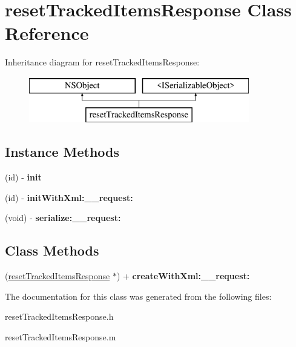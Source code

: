 \hypertarget{interfacereset_tracked_items_response}{}\section{reset\+Tracked\+Items\+Response Class Reference}
\label{interfacereset_tracked_items_response}
Inheritance diagram for reset\+Tracked\+Items\+Response\+:\begin{figure}[H]
\begin{center}
\leavevmode
\includegraphics[height=2.000000cm]{interfacereset_tracked_items_response}
\end{center}
\end{figure}
\subsection*{Instance Methods}
\begin{DoxyCompactItemize}
\item 
\hypertarget{interfacereset_tracked_items_response_a8fa82d26c8ab63be27c94736599c8b39}{}(id) -\/ {\bfseries init}\label{interfacereset_tracked_items_response_a8fa82d26c8ab63be27c94736599c8b39}

\item 
\hypertarget{interfacereset_tracked_items_response_a4f06a7b26edd8d343a584880e1a3c786}{}(id) -\/ {\bfseries init\+With\+Xml\+:\+\_\+\+\_\+request\+:}\label{interfacereset_tracked_items_response_a4f06a7b26edd8d343a584880e1a3c786}

\item 
\hypertarget{interfacereset_tracked_items_response_a26cececd00158b74f90e71c31005a1fe}{}(void) -\/ {\bfseries serialize\+:\+\_\+\+\_\+request\+:}\label{interfacereset_tracked_items_response_a26cececd00158b74f90e71c31005a1fe}

\end{DoxyCompactItemize}
\subsection*{Class Methods}
\begin{DoxyCompactItemize}
\item 
\hypertarget{interfacereset_tracked_items_response_a2cbf374a9a30fa28975d8dc7f142f5e7}{}(\hyperlink{interfacereset_tracked_items_response}{reset\+Tracked\+Items\+Response} $\ast$) + {\bfseries create\+With\+Xml\+:\+\_\+\+\_\+request\+:}\label{interfacereset_tracked_items_response_a2cbf374a9a30fa28975d8dc7f142f5e7}

\end{DoxyCompactItemize}


The documentation for this class was generated from the following files\+:\begin{DoxyCompactItemize}
\item 
reset\+Tracked\+Items\+Response.\+h\item 
reset\+Tracked\+Items\+Response.\+m\end{DoxyCompactItemize}
